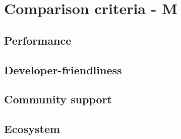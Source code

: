 \chapter{Comparison criteria - M}
\label{cha:WorkingWithLatex}

% 
\section{Performance}
\label{sec:CriteriaPerformance} %

\section{Developer-friendliness}
\label{sec:CriteriaDeveloperFriendliness}

\section{Community support}
\label{sec:CriteriaCommunitySupport}

\section{Ecosystem}
\label{sec:CriteriaEcosystem}
